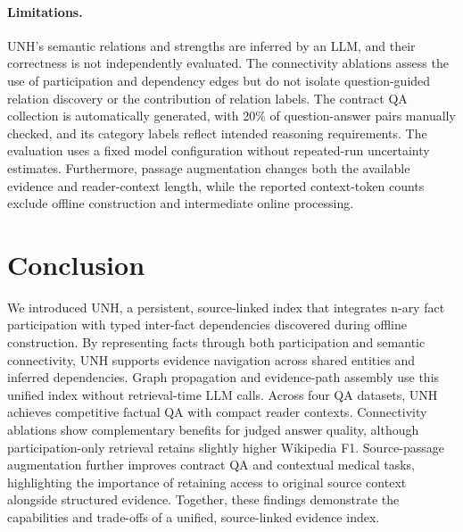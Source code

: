 \documentclass[sigconf, review, anonymous]{acmart}
\newcommand{\sys}{UNH}
\begin{document}
\paragraph{Limitations.}
\label{sec:limitations}
\sys{}'s semantic relations and strengths are inferred by an LLM, and their correctness is not independently evaluated. The connectivity ablations assess the use of participation and dependency edges but do not isolate question-guided relation discovery or the contribution of relation labels. The contract QA collection is automatically generated, with 20\% of question-answer pairs manually checked, and its category labels reflect intended reasoning requirements. The evaluation uses a fixed model configuration without repeated-run uncertainty estimates. Furthermore, passage augmentation changes both the available evidence and reader-context length, while the reported context-token counts exclude offline construction and intermediate online processing.



\section{Conclusion}
We introduced \sys{}, a persistent, source-linked index
that integrates n-ary fact participation with typed
inter-fact dependencies discovered during offline
construction. By representing facts through both
participation and semantic connectivity, UNH supports
evidence navigation across shared entities and inferred
dependencies. Graph propagation and evidence-path
assembly use this unified index without retrieval-time
LLM calls. Across four QA datasets, \sys{} achieves competitive
factual QA with compact reader contexts. Connectivity
ablations show complementary benefits for judged answer
quality, although participation-only retrieval retains
slightly higher Wikipedia F1. Source-passage
augmentation further improves contract QA and
contextual medical tasks, highlighting the importance
of retaining access to original source context alongside
structured evidence. Together, these findings
demonstrate the capabilities and trade-offs of a
unified, source-linked evidence index.


\end{document}
